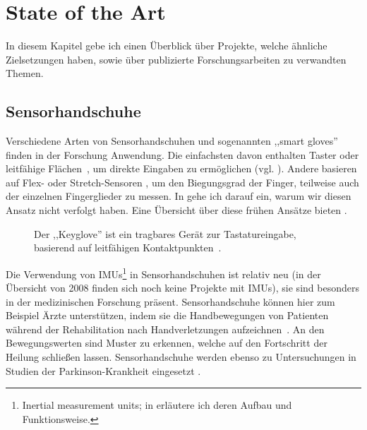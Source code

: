 \chapter{State of the Art} 

In diesem Kapitel gebe ich einen Überblick über Projekte, welche ähnliche
Zielsetzungen haben, sowie über publizierte Forschungsarbeiten zu verwandten
Themen.

\section{Sensorhandschuhe}

Verschiedene Arten von Sensorhandschuhen und sogenannten ,,smart gloves''
finden in der Forschung Anwendung. Die einfachsten davon enthalten Taster oder
leitfähige Flächen~\cite{web:keyglove}, um direkte Eingaben zu ermöglichen
(vgl. ).  Andere basieren auf Flex- oder Stretch-Sensoren
\citep{glove-ole}, um den Biegungsgrad der Finger, teilweise auch der einzelnen
Fingerglieder zu messen.  In  gehe ich darauf ein, warum wir
diesen Ansatz nicht verfolgt haben. Eine Übersicht über diese frühen Ansätze
bieten \citet{dipietro-gloves-survey}.

\begin{figure}
    \centering
    \caption[Der ,,Keyglove''~\cite{web:keyglove}]{Der ,,Keyglove'' ist ein tragbares Gerät zur Tastatureingabe, basierend auf leitfähigen Kontaktpunkten~\cite{web:keyglove}.}
\end{figure}

Die Verwendung von IMUs\footnote{Inertial measurement units; in 
erläutere ich deren Aufbau und Funktionsweise.} in Sensorhandschuhen ist
relativ neu (in der Übersicht von 2008 finden sich noch keine Projekte mit
IMUs), sie sind besonders in der medizinischen Forschung präsent.
Sensorhandschuhe können hier zum Beispiel Ärzte unterstützen, indem sie die
Handbewegungen von Patienten während der Rehabilitation nach Handverletzungen
aufzeichnen~\citep{glove-medical-imu}. An den Bewegungswerten sind Muster zu
erkennen, welche auf den Fortschritt der Heilung schließen lassen.
Sensorhandschuhe werden ebenso zu Untersuchungen in Studien der
Parkinson-Krankheit eingesetzt \citep{cavallo-senshand-parkinsons}.

